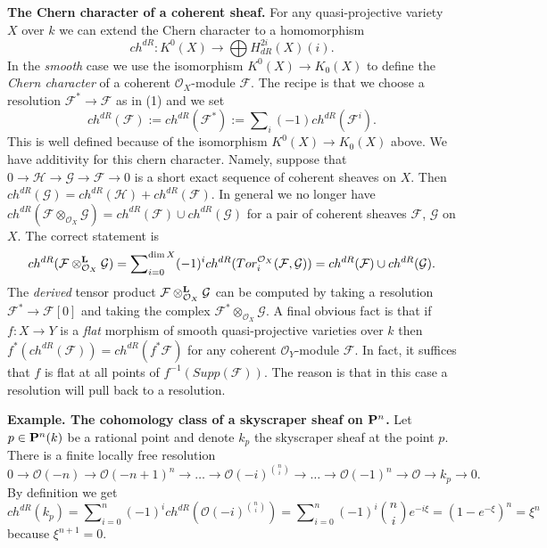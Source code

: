 \medskip\noindent
{\bf The Chern character of a coherent sheaf.}
For any quasi-projective variety $X$ over $k$ we can extend the 
Chern character to a homomorphism
$$
ch^{dR} : K^0(X) \longrightarrow \bigoplus H^{2i}_{dR}(X)(i).
$$
In the {\it smooth} case we use the isomorphism $K^0(X) \to K_0(X)$
to define the {\it Chern character} of a coherent ${\mathcal O}_X$-module
${\mathcal F}$. The recipe is that we choose a resolution
${\mathcal F}^* \to {\mathcal F}$ as in (1) and we set
$$
ch^{dR}({\mathcal F})
:=
ch^{dR}({\mathcal F}^*)
:=
\sum\nolimits_i (-1)ch^{dR}({\mathcal F}^i).
$$
This is well defined because of the isomorphism $K^0(X) \to K_0(X)$
above. We have additivity for this chern character. Namely, suppose
that
$
0
\to
{\mathcal H}
\to 
{\mathcal G}
\to 
{\mathcal F}
\to 
0
$
is a short exact sequence of coherent sheaves on $X$. Then
$ch^{dR}({\mathcal G}) = ch^{dR}({\mathcal H}) + ch^{dR}({\mathcal F})$.
In general we no longer have $ch^{dR}({\mathcal F}\otimes_{{\mathcal O}_X}
{\mathcal G}) = ch^{dR}({\mathcal F}) \cup ch^{dR}({\mathcal G})$
for a pair of coherent sheaves ${\mathcal F}$, ${\mathcal G}$ on $X$.
The correct statement is
$$
ch^{dR}({\mathcal F}\otimes^{\bf L}_{{\mathcal O}_X}{\mathcal G})
=
\sum\nolimits_{i=0}^{\dim X}
(-1)^i
ch^{dR}(Tor_i^{{\mathcal O}_X}({\mathcal F},{\mathcal G}))
=
ch^{dR}({\mathcal F}) \cup ch^{dR}({\mathcal G}).
$$
The {\it derived} tensor product
${\mathcal F}\otimes^{\bf L}_{{\mathcal O}_X}{\mathcal G}$ can be
computed by taking a resolution ${\mathcal F}^* \to {\mathcal F}[0]$
and taking the complex ${\mathcal F}^*\otimes_{{\mathcal O}_X} {\mathcal G}$.
A final obvious fact is that if $f : X \to Y$ is a {\it flat}
morphism of smooth quasi-projective varieties over $k$ then
$f^*( ch^{dR}({\mathcal F}) ) = ch^{dR}(f^*{\mathcal F})$ for any
coherent ${\mathcal O}_Y$-module ${\mathcal F}$. In fact, it suffices
that $f$ is flat at all points of $f^{-1}(Supp({\mathcal F}))$.
The reason is that in this case a resolution will pull
back to a resolution.

\medskip\noindent
{\bf Example. The cohomology class of a skyscraper sheaf on
${\bf P}^n$.} Let $p\in {\bf P}^n(k)$ be a rational point
and denote $k_p$ the skyscraper sheaf at the point $p$.
There is a finite locally free resolution
$$
0
\to
{\mathcal O}(-n)
\to
{\mathcal O}(-n+1)^n
\to
\ldots
\to
{\mathcal O}(-i)^{\binom{n}{i}}
\to
\ldots
\to
{\mathcal O}(-1)^n
\to
{\mathcal O}
\to
k_p
\to
0.
$$
By definition we get
$$
ch^{dR}(k_p)
= 
\sum\nolimits_{i=0}^n
(-1)^i
ch^{dR}( {\mathcal O}(-i)^{\binom{n}{i}} )
=
\sum\nolimits_{i=0}^n
(-1)^i \binom{n}{i} e^{-i \xi}
=
(1 - e^{-\xi})^n 
=
\xi^n
$$
because $\xi^{n+1} = 0$.


